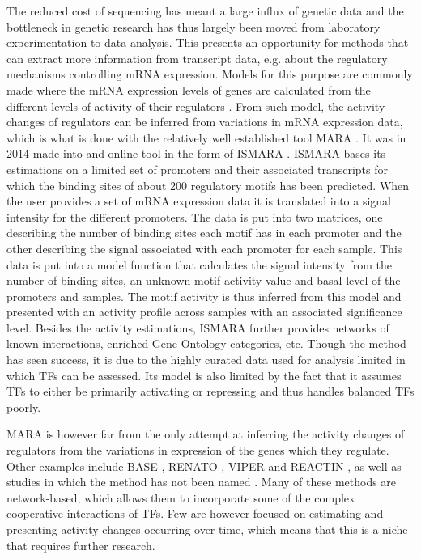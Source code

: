 The reduced cost of sequencing has meant a large influx of genetic data and the bottleneck in genetic research has thus largely been moved from laboratory experimentation to data analysis. This presents an opportunity for methods that can extract more information from transcript data, e.g. about the regulatory mechanisms controlling mRNA expression. Models for this purpose are commonly made where the mRNA expression levels of genes are calculated from the different levels of activity of their regulators \cite{Ouyanga2009,MARA2009,ISMARA2014}. From such model, the activity changes of regulators can be inferred from variations in mRNA expression data, which is what is done with the relatively well established tool MARA \cite{MARA2009}. It was in 2014 made into and online tool in the form of ISMARA \cite{ISMARA2014}. ISMARA bases its estimations on a limited set of promoters and their associated transcripts for which the binding sites of about 200 regulatory motifs has been predicted. When the user provides a set of mRNA expression data it is translated into a signal intensity for the different promoters. The data is put into two matrices, one describing the number of binding sites each motif has in each promoter and the other describing the signal associated with each promoter for each sample. This data is put into a model function that calculates the signal intensity from the number of binding sites, an unknown motif activity value and basal level of the promoters and samples. The motif activity is thus inferred from this model and presented with an activity profile across samples with an associated significance level. Besides the activity estimations, ISMARA further provides networks of known interactions, enriched Gene Ontology categories, etc. Though the method has seen success, it is due to the highly curated data used for analysis limited in which \acp{TF} can be assessed. Its model is also limited by the fact that it assumes TFs to either be primarily activating or repressing and thus handles balanced \acp{TF} poorly. 

MARA is however far from the only attempt at inferring the activity changes of regulators from the variations in expression of the genes which they regulate. Other examples include BASE \cite{Cheng2007}, RENATO \cite{Bleda2012}, VIPER \cite{Alvarez2016} and REACTIN \cite{Zhu2013}, as well as studies in which the method has not been named \cite{Schacht2014}. Many of these methods are network-based, which allows them to incorporate some of the complex cooperative interactions of \acp{TF}. Few are however focused on estimating and presenting activity changes occurring over time, which means that this is a niche that requires further research.

